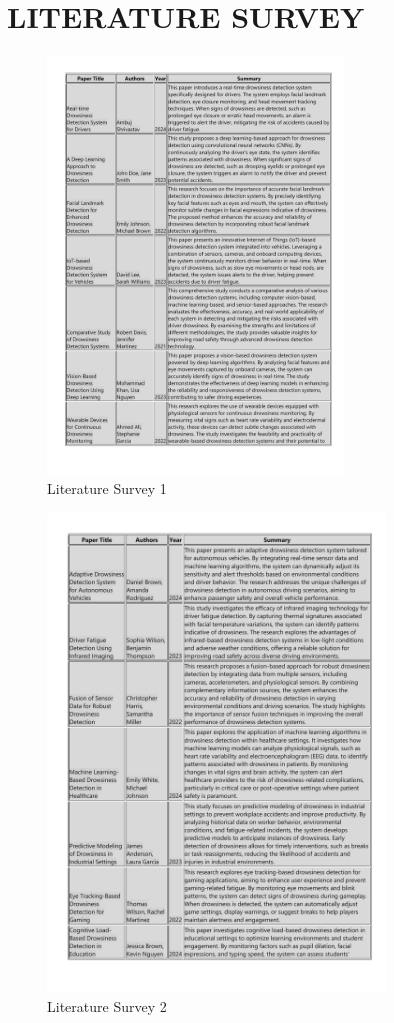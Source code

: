 \documentclass[12pt]{article}
\begin{document}
\section{LITERATURE SURVEY}
\begin{figure}[htbp]
    \centering
    \includegraphics[width=0.7\textwidth]{litreture_survey.pdf} 
    \caption{Literature Survey 1}
\end{figure}
\FloatBarrier
\begin{figure}[htbp]
    \centering
    \includegraphics[width=0.8\textwidth]{lit2.pdf} 
    \caption{Literature Survey 2}
\end{figure}
\FloatBarrier
\end{document}
